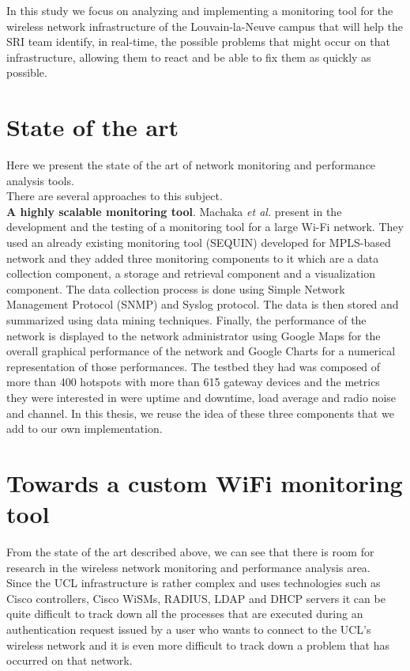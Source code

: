 In this study we focus on analyzing and implementing a monitoring tool for the wireless network infrastructure of the Louvain-la-Neuve campus that will help the SRI team identify, in real-time, the possible problems that might occur on that infrastructure, allowing them to react and be able to fix them as quickly as possible.


\section{State of the art}
Here we present the state of the art of network monitoring and performance analysis tools.\\
There are several approaches to this subject.\\

\textbf{A highly scalable monitoring tool}. Machaka \textit{et al.} present in \cite{article1} the development and the testing of a monitoring tool for a large Wi-Fi network. They used an already existing monitoring tool (SEQUIN) developed for MPLS-based network and they added three monitoring components to it which are a data collection component, a storage and retrieval component and a visualization component. The data collection process is done using Simple Network Management Protocol (SNMP) and Syslog protocol. The data is then stored and summarized using data mining techniques. Finally, the performance of the network is displayed to the network administrator using Google Maps for the overall graphical performance of the network and Google Charts for a numerical representation of those performances. The testbed they had was composed of more than 400 hotspots with more than 615 gateway devices and the metrics they were interested in were uptime and downtime, load average and radio noise and channel. In this thesis, we reuse the idea of these three components that we add to our own implementation.



\section{Towards a custom WiFi monitoring tool}
From the state of the art described above, we can see that there is room for research in the wireless network monitoring and performance analysis area.\\
Since the UCL infrastructure is rather complex and uses technologies such as Cisco controllers, Cisco WiSMs, RADIUS, LDAP and DHCP servers it can be quite difficult to track down all the processes that are executed during an authentication request issued by a user who wants to connect to the UCL's wireless network and it is even more difficult to track down a problem that has occurred on that network.

